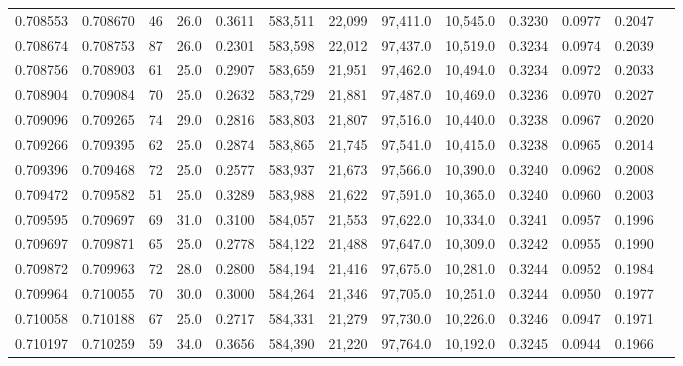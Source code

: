 \begin{tabular}{rrrrrrrrrrrrr}
0.708553 & 0.708670 &    46 & 26.0 &                                     0.3611 & 583,511 &  22,099 &  97,411.0 &  10,545.0 & 0.3230 & 0.0977 & 0.2047 \\
0.708674 & 0.708753 &    87 & 26.0 &                                     0.2301 & 583,598 &  22,012 &  97,437.0 &  10,519.0 & 0.3234 & 0.0974 & 0.2039 \\
0.708756 & 0.708903 &    61 & 25.0 &                                     0.2907 & 583,659 &  21,951 &  97,462.0 &  10,494.0 & 0.3234 & 0.0972 & 0.2033 \\
0.708904 & 0.709084 &    70 & 25.0 &                                     0.2632 & 583,729 &  21,881 &  97,487.0 &  10,469.0 & 0.3236 & 0.0970 & 0.2027 \\
0.709096 & 0.709265 &    74 & 29.0 &                                     0.2816 & 583,803 &  21,807 &  97,516.0 &  10,440.0 & 0.3238 & 0.0967 & 0.2020 \\
0.709266 & 0.709395 &    62 & 25.0 &                                     0.2874 & 583,865 &  21,745 &  97,541.0 &  10,415.0 & 0.3238 & 0.0965 & 0.2014 \\
0.709396 & 0.709468 &    72 & 25.0 &                                     0.2577 & 583,937 &  21,673 &  97,566.0 &  10,390.0 & 0.3240 & 0.0962 & 0.2008 \\
0.709472 & 0.709582 &    51 & 25.0 &                                     0.3289 & 583,988 &  21,622 &  97,591.0 &  10,365.0 & 0.3240 & 0.0960 & 0.2003 \\
0.709595 & 0.709697 &    69 & 31.0 &                                     0.3100 & 584,057 &  21,553 &  97,622.0 &  10,334.0 & 0.3241 & 0.0957 & 0.1996 \\
0.709697 & 0.709871 &    65 & 25.0 &                                     0.2778 & 584,122 &  21,488 &  97,647.0 &  10,309.0 & 0.3242 & 0.0955 & 0.1990 \\
0.709872 & 0.709963 &    72 & 28.0 &                                     0.2800 & 584,194 &  21,416 &  97,675.0 &  10,281.0 & 0.3244 & 0.0952 & 0.1984 \\
0.709964 & 0.710055 &    70 & 30.0 &                                     0.3000 & 584,264 &  21,346 &  97,705.0 &  10,251.0 & 0.3244 & 0.0950 & 0.1977 \\
0.710058 & 0.710188 &    67 & 25.0 &                                     0.2717 & 584,331 &  21,279 &  97,730.0 &  10,226.0 & 0.3246 & 0.0947 & 0.1971 \\
0.710197 & 0.710259 &    59 & 34.0 &                                     0.3656 & 584,390 &  21,220 &  97,764.0 &  10,192.0 & 0.3245 & 0.0944 & 0.1966 \\

\end{tabular}
